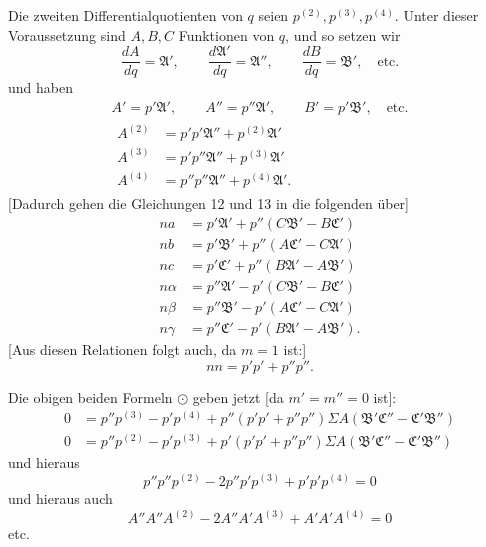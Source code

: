 \par{}%
Die zweiten Differentialquotienten von $q$ seien $p^{(2)},p^{(3)},p^{(4)}$. Unter dieser Voraussetzung sind $A,B,C$ Funktionen von $q$, und so setzen wir
\[
\frac{dA}{dq}=\mathfrak{A}',\qquad\frac{d\mathfrak{A}'}{dq}=\mathfrak{A}'',\qquad\frac{dB}{dq}=\mathfrak{B}',\quad\text{etc.}
\]
und haben
\[
\begin{gathered}
A'=p'\mathfrak{A}',\qquad A''=p''\mathfrak{A}',\qquad B'=p'\mathfrak{B}',\quad\text{etc.}\\
\begin{aligned}
A^{(2)}&=p'p'\mathfrak{A}''+p^{(2)}\mathfrak{A}'\\
A^{(3)}&=p'p''\mathfrak{A}''+p^{(3)}\mathfrak{A}'\\
A^{(4)}&=p''p''\mathfrak{A}''+p^{(4)}\mathfrak{A}'.
\end{aligned}
\end{gathered}
\]
[Dadurch gehen die Gleichungen 12 und 13 in die folgenden über]
\[
\begin{aligned}
na&=p'\mathfrak{A}'+p''(C\mathfrak{B}'-B\mathfrak{C}')\\
nb&=p'\mathfrak{B}'+p''(A\mathfrak{C}'-C\mathfrak{A}')\\
nc&=p'\mathfrak{C}'+p''(B\mathfrak{A}'-A\mathfrak{B}')\\[4pt]
n\alpha&=p''\mathfrak{A}'-p'(C\mathfrak{B}'-B\mathfrak{C}')\\
n\beta&=p''\mathfrak{B}'-p'(A\mathfrak{C}'-C\mathfrak{A}')\\
n\gamma&=p''\mathfrak{C}'-p'(B\mathfrak{A}'-A\mathfrak{B}').
\end{aligned}
\]
[Aus diesen Relationen folgt auch, da $m=1$ ist:]
\[
nn=p'p'+p''p''.
\]
\par\indent Die obigen beiden Formeln $\odot$ geben jetzt [da $m'=m''=0$ ist]:
\[
\begin{aligned}
0&=p''p^{(3)}-p'p^{(4)}+p''(p'p'+p''p'')\Sigma A(\mathfrak{B}'\mathfrak{C}''-\mathfrak{C}'\mathfrak{B}'')\\
0&=p''p^{(2)}-p'p^{(3)}+p'(p'p'+p''p'')\Sigma A(\mathfrak{B}'\mathfrak{C}''-\mathfrak{C}'\mathfrak{B}'')
\end{aligned}
\]
und hieraus
\[
p''p''p^{(2)}-2p''p'p^{(3)}+p'p'p^{(4)}=0
\]
und hieraus auch
\[
A''A''A^{(2)}-2A''A'A^{(3)}+A'A'A^{(4)}=0
\]
etc.
